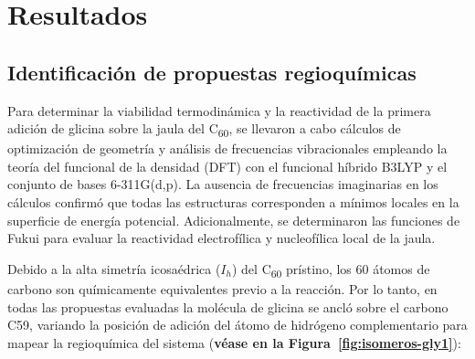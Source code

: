 
                                                                                                                                                                                                                                                                                                                                                                                                                                                                                                                                                                                                                                                                                                                                                                                                                                                                                                                                                                                                                                                                                                                                                                                                                                 \chapter{Resultados}
\section{Identificación de propuestas regioquímicas}

Para determinar la viabilidad termodinámica y la reactividad de la primera adición de glicina sobre la jaula del C\textsubscript{60}, se llevaron a cabo cálculos de optimización de geometría y análisis de frecuencias vibracionales empleando la teoría del funcional de la densidad (DFT) con el funcional híbrido B3LYP y el conjunto de bases 6-311G(d,p). La ausencia de frecuencias imaginarias en los cálculos confirmó que todas las estructuras corresponden a mínimos locales en la superficie de energía potencial. Adicionalmente, se determinaron las funciones de Fukui para evaluar la reactividad electrofílica y nucleofílica local de la jaula.

Debido a la alta simetría icosaédrica ($I_h$) del C\textsubscript{60} prístino, los 60 átomos de carbono son químicamente equivalentes previo a la reacción. Por lo tanto, en todas las propuestas evaluadas la molécula de glicina se ancló sobre el carbono C59, variando la posición de adición del átomo de hidrógeno complementario para mapear la regioquímica del sistema  (\textbf{véase en la Figura~\ref{fig:isomeros-gly1}}):

